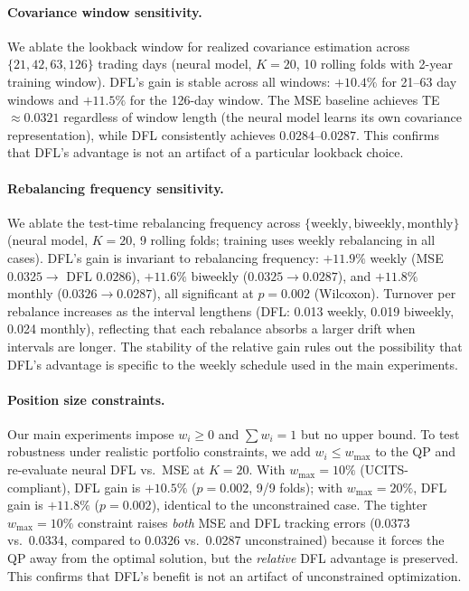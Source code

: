 \documentclass[letterpaper]{article}
\begin{document}
\paragraph{Covariance window sensitivity.}
We ablate the lookback window for realized covariance estimation across $\{21, 42, 63, 126\}$ trading days (neural model, $K{=}20$, 10 rolling folds with 2-year training window). DFL's gain is stable across all windows: $+10.4\%$ for 21--63 day windows and $+11.5\%$ for the 126-day window. The MSE baseline achieves TE $\approx 0.0321$ regardless of window length (the neural model learns its own covariance representation), while DFL consistently achieves $0.0284$--$0.0287$. This confirms that DFL's advantage is not an artifact of a particular lookback choice.

\paragraph{Rebalancing frequency sensitivity.}
We ablate the test-time rebalancing frequency across $\{\text{weekly}, \text{biweekly}, \text{monthly}\}$ (neural model, $K{=}20$, 9 rolling folds; training uses weekly rebalancing in all cases). DFL's gain is invariant to rebalancing frequency: $+11.9\%$ weekly (MSE $0.0325 \to$ DFL $0.0286$), $+11.6\%$ biweekly ($0.0325 \to 0.0287$), and $+11.8\%$ monthly ($0.0326 \to 0.0287$), all significant at $p = 0.002$ (Wilcoxon). Turnover per rebalance increases as the interval lengthens (DFL: 0.013 weekly, 0.019 biweekly, 0.024 monthly), reflecting that each rebalance absorbs a larger drift when intervals are longer. The stability of the relative gain rules out the possibility that DFL's advantage is specific to the weekly schedule used in the main experiments.

\paragraph{Position size constraints.}
Our main experiments impose $w_i \geq 0$ and $\sum w_i = 1$ but no upper bound. To test robustness under realistic portfolio constraints, we add $w_i \leq w_{\max}$ to the QP and re-evaluate neural DFL vs.\ MSE at $K{=}20$. With $w_{\max} = 10\%$ (UCITS-compliant), DFL gain is $+10.5\%$ ($p = 0.002$, 9/9 folds); with $w_{\max} = 20\%$, DFL gain is $+11.8\%$ ($p = 0.002$), identical to the unconstrained case. The tighter $w_{\max}{=}10\%$ constraint raises \emph{both} MSE and DFL tracking errors (0.0373 vs.\ 0.0334, compared to 0.0326 vs.\ 0.0287 unconstrained) because it forces the QP away from the optimal solution, but the \emph{relative} DFL advantage is preserved. This confirms that DFL's benefit is not an artifact of unconstrained optimization.
\end{document}
